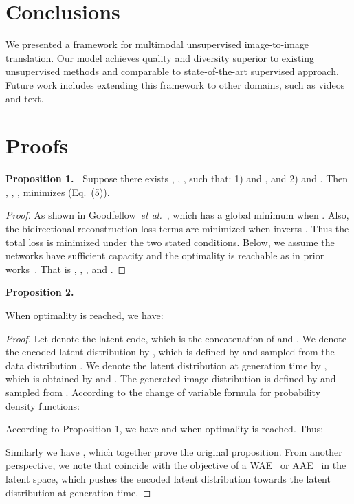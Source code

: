 \documentclass[runningheads]{llncs}
\newcommand{\oneshot}[2]{\noindent\textbf{Proposition {#1}.\ }{#2}}
\def\etal{\emph{et al.}\xspace}
\begin{document}
\section{Conclusions}
We presented a framework for multimodal unsupervised image-to-image translation. Our model achieves quality and diversity superior to existing unsupervised methods and comparable to state-of-the-art supervised approach. Future work includes extending this framework to other domains, such as videos and text.




	
	

	\appendix
	\section{Proofs}
	\label{app:proofs}
	
	\oneshot{1}{
		Suppose there exists , , ,  such that: 1)  and , and 2)  and . Then , , ,  minimizes  (Eq.~(5)).
	}
\begin{proof}
		
		As shown in Goodfellow~\etal~\cite{goodfellow2014generative},  which has a global minimum when . Also, the bidirectional reconstruction loss terms are minimized when  inverts . Thus the total loss is minimized under the two stated conditions. Below, we assume the networks have sufficient capacity and the optimality is reachable as in prior works~\cite{goodfellow2014generative,li2017alice}. That is , 	, , and .
	\end{proof}

\oneshot{2}{\vspace{-0.1in}
	When optimality is reached, we have:
	\label{proposition:2}
		
}
\begin{proof}
		Let  denote the latent code, which is the concatenation of  and . We denote the encoded latent distribution by , which is defined by  and  sampled from the data distribution . We denote the latent distribution at generation time by , which is obtained by  and . The generated image distribution  is defined by  and  sampled from . According to the change of variable formula for probability density functions:
		
		According to Proposition 1, we have  and  when optimality is reached. Thus:
		
		Similarly we have , which together prove the original proposition. From another perspective, we note that  coincide with the objective of a WAE~\cite{tolstikhin2018wasserstein} or AAE~\cite{makhzani2015adversarial} in the latent space, which pushes the encoded latent distribution towards the latent distribution at generation time.
	\end{proof}
\end{document}

